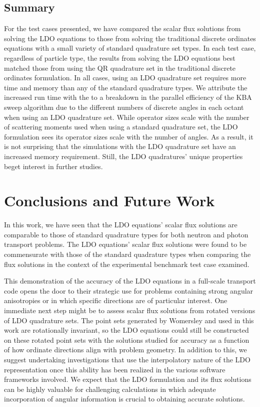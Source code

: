 \documentclass{article} %
\begin{document}
\FloatBarrier
\subsection{Summary}

For the test cases presented, we have compared the scalar flux solutions from
solving the LDO equations to those from solving the traditional discrete
ordinates equations with a small variety of standard quadrature set types. In
each test case, regardless of particle type, the results from solving the LDO
equations best matched those from using the QR quadrature set in the
traditional discrete ordinates formulation. In all cases, using an LDO
quadrature set requires more time and memory than any of the standard
quadrature types. We attribute the increased run time with the to a breakdown
in the parallel efficiency of the KBA sweep algorithm due to the different
numbers of discrete angles in each octant when using an LDO quadrature set.
While operator sizes scale with the number of scattering moments used when
using a standard quadrature set, the LDO formulation sees its operator sizes
scale with the number of angles. As a result, it is not surprising that the
simulations with the LDO quadrature set have an increased memory requirement.
Still, the LDO quadratures' unique properties beget interest in further
studies.

\section{Conclusions and Future Work}
\label{sec:conclusions}

In this work, we have seen that the LDO equations' scalar flux solutions are
comparable to those of standard quadrature types for both neutron and photon
transport problems. The LDO equations' scalar flux solutions were found to be
commensurate with those of the standard quadrature types when comparing the
flux solutions in the context of the experimental benchmark test case
examined.

This demonstration of the accuracy of the LDO equations in a full-scale
transport code opens the door to their strategic use for problems containing
strong angular anisotropies or in which specific directions are of particular
interest. One immediate next step might be to assess scalar flux solutions
from rotated versions of LDO quadrature sets. The point sets generated by
Womersley and used in this work are rotationally invariant, so the LDO
equations could still be constructed on these rotated point sets with the
solutions studied for accuracy as a function of how ordinate directions align
with problem geometry. In addition to this, we suggest undertaking
investigations that use the interpolatory nature of the LDO representation
once this ability has been realized in the various software frameworks
involved. We expect that the LDO formulation and its flux solutions can be
highly valuable for challenging calculations in which adequate incorporation
of angular information is crucial to obtaining accurate solutions.
\end{document}

